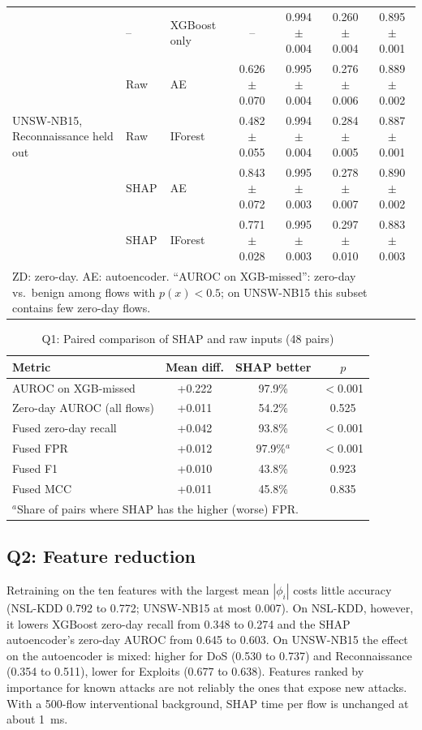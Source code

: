 \documentclass[conference]{IEEEtran}
\begin{document}
\begin{table}[t]
\begin{tabular}{lllcccc}
\midrule
\multirow{5}{*}{UNSW-NB15, Reconnaissance held out} & -- & XGBoost only & -- & 0.994 $\pm$ 0.004 & 0.260 $\pm$ 0.004 & 0.895 $\pm$ 0.001 \\
 & Raw & AE & 0.626 $\pm$ 0.070 & 0.995 $\pm$ 0.004 & 0.276 $\pm$ 0.006 & 0.889 $\pm$ 0.002 \\
 & Raw & IForest & 0.482 $\pm$ 0.055 & 0.994 $\pm$ 0.004 & 0.284 $\pm$ 0.005 & 0.887 $\pm$ 0.001 \\
 & SHAP & AE & 0.843 $\pm$ 0.072 & 0.995 $\pm$ 0.003 & 0.278 $\pm$ 0.007 & 0.890 $\pm$ 0.002 \\
 & SHAP & IForest & 0.771 $\pm$ 0.028 & 0.995 $\pm$ 0.003 & 0.297 $\pm$ 0.010 & 0.883 $\pm$ 0.003 \\
\bottomrule
\multicolumn{7}{l}{\footnotesize ZD: zero-day. AE: autoencoder. ``AUROC on XGB-missed'': zero-day vs.\ benign among flows with $p(x)<0.5$; on UNSW-NB15 this subset contains few zero-day flows.}
\end{tabular}
\end{table}

\begin{table}[t]
\caption{Q1: Paired comparison of SHAP and raw inputs (48 pairs)}
\label{tab:wilcoxon}
\centering
\begin{tabular}{lccc}
\toprule
Metric & Mean diff. & SHAP better & $p$ \\
\midrule
AUROC on XGB-missed & +0.222 & 97.9\% & $<$0.001 \\
Zero-day AUROC (all flows) & +0.011 & 54.2\% & 0.525 \\
Fused zero-day recall & +0.042 & 93.8\% & $<$0.001 \\
Fused FPR & +0.012 & 97.9\%$^{a}$ & $<$0.001 \\
Fused F1 & +0.010 & 43.8\% & 0.923 \\
Fused MCC & +0.011 & 45.8\% & 0.835 \\
\bottomrule
\multicolumn{4}{l}{\footnotesize $^{a}$Share of pairs where SHAP has the higher (worse) FPR.}
\end{tabular}
\end{table}

\subsection{Q2: Feature reduction}
Retraining on the ten features with the largest mean $|\phi_i|$ costs little accuracy (NSL-KDD 0.792 to 0.772; UNSW-NB15 at most 0.007). On NSL-KDD, however, it lowers XGBoost zero-day recall from 0.348 to 0.274 and the SHAP autoencoder's zero-day AUROC from 0.645 to 0.603. On UNSW-NB15 the effect on the autoencoder is mixed: higher for DoS (0.530 to 0.737) and Reconnaissance (0.354 to 0.511), lower for Exploits (0.677 to 0.638). Features ranked by importance for known attacks are not reliably the ones that expose new attacks. With a 500-flow interventional background, SHAP time per flow is unchanged at about 1~ms.
\end{document}
